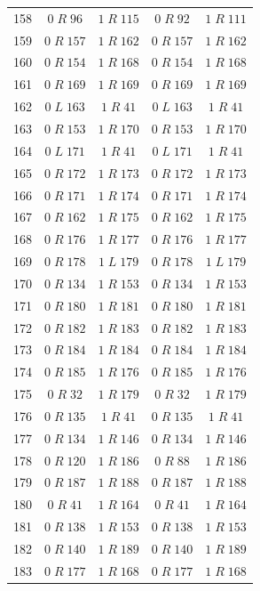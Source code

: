 \begin{longtable}{rcccc}
158 & $0\;R\;96$ & $1\;R\;115$ & $0\;R\;92$ & $1\;R\;111$\\
159 & $0\;R\;157$ & $1\;R\;162$ & $0\;R\;157$ & $1\;R\;162$\\
160 & $0\;R\;154$ & $1\;R\;168$ & $0\;R\;154$ & $1\;R\;168$\\
161 & $0\;R\;169$ & $1\;R\;169$ & $0\;R\;169$ & $1\;R\;169$\\
162 & $0\;L\;163$ & $1\;R\;41$ & $0\;L\;163$ & $1\;R\;41$\\
163 & $0\;R\;153$ & $1\;R\;170$ & $0\;R\;153$ & $1\;R\;170$\\
164 & $0\;L\;171$ & $1\;R\;41$ & $0\;L\;171$ & $1\;R\;41$\\
165 & $0\;R\;172$ & $1\;R\;173$ & $0\;R\;172$ & $1\;R\;173$\\
166 & $0\;R\;171$ & $1\;R\;174$ & $0\;R\;171$ & $1\;R\;174$\\
167 & $0\;R\;162$ & $1\;R\;175$ & $0\;R\;162$ & $1\;R\;175$\\
168 & $0\;R\;176$ & $1\;R\;177$ & $0\;R\;176$ & $1\;R\;177$\\
169 & $0\;R\;178$ & $1\;L\;179$ & $0\;R\;178$ & $1\;L\;179$\\
170 & $0\;R\;134$ & $1\;R\;153$ & $0\;R\;134$ & $1\;R\;153$\\
171 & $0\;R\;180$ & $1\;R\;181$ & $0\;R\;180$ & $1\;R\;181$\\
172 & $0\;R\;182$ & $1\;R\;183$ & $0\;R\;182$ & $1\;R\;183$\\
173 & $0\;R\;184$ & $1\;R\;184$ & $0\;R\;184$ & $1\;R\;184$\\
174 & $0\;R\;185$ & $1\;R\;176$ & $0\;R\;185$ & $1\;R\;176$\\
175 & $0\;R\;32$ & $1\;R\;179$ & $0\;R\;32$ & $1\;R\;179$\\
176 & $0\;R\;135$ & $1\;R\;41$ & $0\;R\;135$ & $1\;R\;41$\\
177 & $0\;R\;134$ & $1\;R\;146$ & $0\;R\;134$ & $1\;R\;146$\\
178 & $0\;R\;120$ & $1\;R\;186$ & $0\;R\;88$ & $1\;R\;186$\\
179 & $0\;R\;187$ & $1\;R\;188$ & $0\;R\;187$ & $1\;R\;188$\\
180 & $0\;R\;41$ & $1\;R\;164$ & $0\;R\;41$ & $1\;R\;164$\\
181 & $0\;R\;138$ & $1\;R\;153$ & $0\;R\;138$ & $1\;R\;153$\\
182 & $0\;R\;140$ & $1\;R\;189$ & $0\;R\;140$ & $1\;R\;189$\\
183 & $0\;R\;177$ & $1\;R\;168$ & $0\;R\;177$ & $1\;R\;168$\\

\end{longtable}
